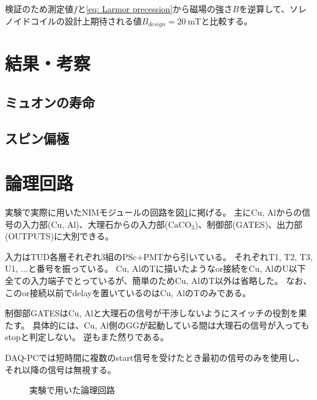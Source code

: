 \documentclass[dvipdfmx]{jsarticle}
\renewcommand{\theequation}{\thesection.\arabic{equation}}
\renewcommand{\thefigure}{\thesection.\arabic{figure}}
\renewcommand{\thetable}{\thesection.\arabic{table}}
\begin{document}
検証のため測定値$f$と\eqref{eq: Larmor precession}から磁場の強さ$B$を逆算して、ソレノイドコイルの設計上期待される値$B_{design}=\SI{20}{\milli\tesla}$と比較する。


\section{結果・考察}
\subsection{ミュオンの寿命}

\subsection{スピン偏極}


\pagebreak



\appendix
\setcounter{section}{0}
\setcounter{equation}{1}
\setcounter{figure}{1}
\setcounter{table}{1}
\renewcommand{\theequation}{\Alph{section}.\arabic{equation} }
\renewcommand{\thefigure}{\Alph{section}.\arabic{equation} }
\renewcommand{\thetable}{\Alph{section}.\arabic{equation} }

\section{論理回路}
\label{sec: logic circuit}

実験で実際に用いたNIMモジュールの回路を図\ref{fig: full circuit}に掲げる。
主にCu, Alからの信号の入力部(Cu, Al)、大理石からの入力部($\mathrm{CaCO_3}$)、制御部(GATES)、出力部(OUTPUTS)に大別できる。

入力はTUD各層それぞれ3組のPSc+PMTから引いている。
それぞれT1, T2, T3, U1, ...と番号を振っている。
Cu, AlのTに描いたようなor接続をCu, AlのU以下全ての入力端子でとっているが、簡単のためCu, AlのT以外は省略した。
なお、このor接続以前でdelayを置いているのはCu, AlのTのみである。

制御部GATESはCu, Alと大理石の信号が干渉しないようにスイッチの役割を果たす。
具体的には、Cu, Al側のGGが起動している間は大理石の信号が入ってもstopと判定しない。
逆もまた然りである。

DAQ-PCでは短時間に複数のstart信号を受けたとき最初の信号のみを使用し、それ以降の信号は無視する。

\begin{landscape}
    \begin{figure}
        \centering
        
        \caption{実験で用いた論理回路}
        \label{fig: full circuit}
    \end{figure}
\end{landscape}
\end{document}
